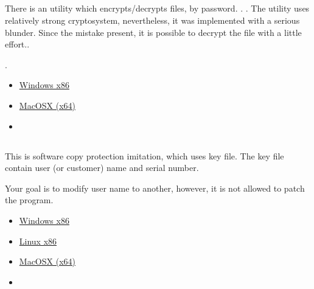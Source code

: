 \subsection{}

{There is an utility which encrypts/decrypts files, by password}.
.
.
{The utility uses relatively strong cryptosystem, nevertheless, it was implemented with a serious blunder.
Since the mistake present, it is possible to decrypt the file with a little effort.}.

.

\begin{itemize}
\item
\href{http://yurichev.com/RE-exercises/middle/4/amateur_cryptor.exe}{Windows x86}

\item
\href{http://yurichev.com/RE-exercises/middle/3/unknown_utility_2_3_MacOSX.tar}{MacOSX (x64)}

\item
\href{http://yurichev.com/RE-exercises/middle/4/text_encrypted}{}
\end{itemize}

\subsection{}

{This is software copy protection imitation, which uses key file}.
{The key file contain user (or customer) name and serial number}.

{Your goal is to modify user name to another, however, it is not allowed to patch the program}.

\begin{itemize}
\item
\href{http://yurichev.com/RE-exercises/middle/5/super_mega_protection.exe}{Windows x86}

\item
\href{http://yurichev.com/RE-exercises/middle/5/super_mega_protection.tar}{Linux x86}

\item
\href{http://yurichev.com/RE-exercises/middle/5/super_mega_protection_MacOSX.tar}{MacOSX (x64)}

\item
\href{http://yurichev.com/RE-exercises/middle/5/sample.key}{}
\end{itemize}

